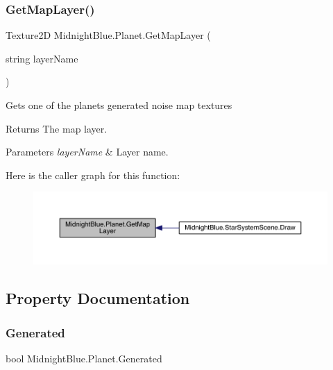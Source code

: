 \subsubsection{\texorpdfstring{Get\+Map\+Layer()}{GetMapLayer()}}
{\footnotesize\ttfamily Texture2D Midnight\+Blue.\+Planet.\+Get\+Map\+Layer (\begin{DoxyParamCaption}\item[{string}]{layer\+Name }\end{DoxyParamCaption})\hspace{0.3cm}{\ttfamily [inline]}}



Gets one of the planets generated noise map textures 

\begin{DoxyReturn}{Returns}
The map layer.
\end{DoxyReturn}

\begin{DoxyParams}{Parameters}
{\em layer\+Name} & Layer name.\\
\hline
\end{DoxyParams}
Here is the caller graph for this function\+:
\nopagebreak
\begin{figure}[H]
\begin{center}
\leavevmode
\includegraphics[width=350pt]{class_midnight_blue_1_1_planet_ac3b3442ad8f168a8d9151386592eb270_icgraph}
\end{center}
\end{figure}


\subsection{Property Documentation}
\hypertarget{class_midnight_blue_1_1_planet_a525e5089a0a522069f10302d9ece26e1}{}\label{class_midnight_blue_1_1_planet_a525e5089a0a522069f10302d9ece26e1} 
\subsubsection{\texorpdfstring{Generated}{Generated}}
{\footnotesize\ttfamily bool Midnight\+Blue.\+Planet.\+Generated\hspace{0.3cm}{\ttfamily [get]}}



